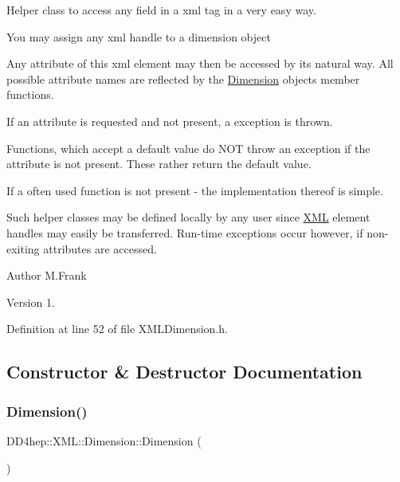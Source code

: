 Helper class to access any field in a xml tag in a very easy way.
\begin{DoxyItemize}
\item You may assign any xml handle to a dimension object
\item Any attribute of this xml element may then be accessed by it\textquotesingle{}s natural way. All possible attribute names are reflected by the \hyperlink{struct_d_d4hep_1_1_x_m_l_1_1_dimension}{Dimension} object\textquotesingle{}s member functions.
\item If an attribute is requested and not present, a exception is thrown.
\item Functions, which accept a default value do N\+OT throw an exception if the attribute is not present. These rather return the default value.
\item If a often used function is not present -\/ the implementation thereof is simple.
\end{DoxyItemize}

Such helper classes may be defined locally by any user since \hyperlink{namespace_d_d4hep_1_1_x_m_l}{X\+ML} element handles may easily be transferred. Run-\/time exceptions occur however, if non-\/exiting attributes are accessed.

\begin{DoxyAuthor}{Author}
M.\+Frank 
\end{DoxyAuthor}
\begin{DoxyVersion}{Version}
1. 
\end{DoxyVersion}


Definition at line 52 of file X\+M\+L\+Dimension.\+h.



\subsection{Constructor \& Destructor Documentation}
\hypertarget{struct_d_d4hep_1_1_x_m_l_1_1_dimension_a26a1bd5015aa6f00de8ab79682a42e89}{}\label{struct_d_d4hep_1_1_x_m_l_1_1_dimension_a26a1bd5015aa6f00de8ab79682a42e89} 
\subsubsection{\texorpdfstring{Dimension()}{Dimension()}\hspace{0.1cm}{\footnotesize\ttfamily [1/3]}}
{\footnotesize\ttfamily D\+D4hep\+::\+X\+M\+L\+::\+Dimension\+::\+Dimension (\begin{DoxyParamCaption}{ }\end{DoxyParamCaption})\hspace{0.3cm}{\ttfamily [inline]}}




